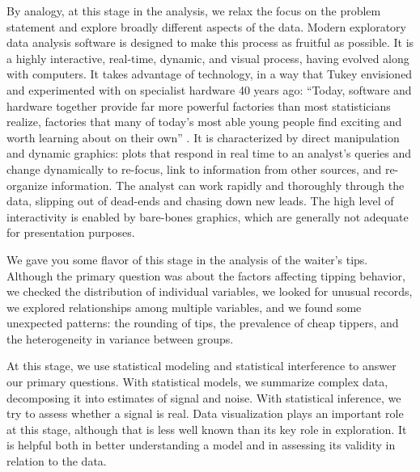 By analogy, at this stage in the analysis, we relax the focus on the
problem statement and explore broadly different aspects of the
data. Modern exploratory data analysis software is designed to make
this process as fruitful as possible.  It is a highly interactive,
real-time, dynamic, and visual process, having evolved along with
computers.  It takes advantage of technology, in a way that Tukey
envisioned and experimented with on specialist hardware 40 years ago:
``Today, software and hardware together provide far more powerful
factories than most statisticians realize, factories that many of
today's most able young people find exciting and worth learning about
on their own'' \cite{Tu65}. It is characterized by direct manipulation
and dynamic graphics: plots that respond in real time to an analyst's
queries and change dynamically to re-focus, link to information from
other sources, and re-organize information. The analyst can
work rapidly and thoroughly through the data, slipping out of
dead-ends and chasing down new leads. The high level of interactivity
is enabled by bare-bones graphics, which are generally not adequate
for presentation purposes.

We gave you some flavor of this stage in the analysis of the waiter's
tips.  Although the primary question was about the factors affecting
tipping behavior, we checked the distribution of individual variables,
we looked for unusual records, we explored relationships among
multiple variables, and we found some unexpected patterns: the
rounding of tips, the prevalence of cheap tippers, and the
heterogeneity in variance between groups.




\vspace{1em}


At this stage, we use statistical modeling and statistical
interference to answer our primary questions.  With statistical
models, we summarize complex data, decomposing it into estimates of
signal and noise.  With statistical inference, we try to assess whether a
signal is real.  Data visualization plays an important role at this
stage, although that is less well known than its key role in
exploration.  It is helpful both in better understanding a model and
in assessing its validity in relation to the data.

